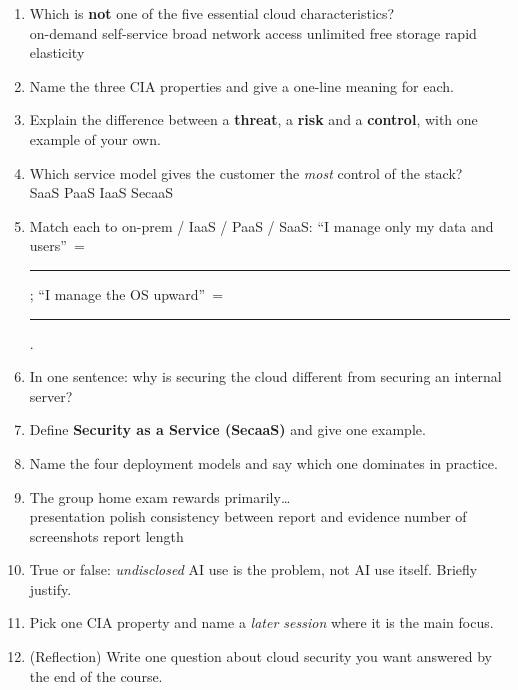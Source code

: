 \documentclass[11pt]{article}
\begin{document}
\begin{enumerate}
\item Which is \textbf{not} one of the five essential cloud characteristics?\\
      \cbox on-demand self-service \quad \cbox broad network access \quad
      \cbox unlimited free storage \quad \cbox rapid elasticity
\item Name the three CIA properties and give a one-line meaning for each.
\item Explain the difference between a \textbf{threat}, a \textbf{risk} and a \textbf{control}, with
      one example of your own.
\item Which service model gives the customer the \emph{most} control of the stack?\\
      \cbox SaaS \quad \cbox PaaS \quad \cbox IaaS \quad \cbox SecaaS
\item Match each to on-prem / IaaS / PaaS / SaaS: ``I manage only my data and users'' \,=\,
      \rule{2.2cm}{0.3pt}; \quad ``I manage the OS upward'' \,=\, \rule{2.2cm}{0.3pt}.
\item In one sentence: why is securing the cloud different from securing an internal server?
\item Define \textbf{Security as a Service (SecaaS)} and give one example.
\item Name the four deployment models and say which one dominates in practice.
\item The group home exam rewards primarily\dots\\
      \cbox presentation polish \quad \cbox consistency between report and evidence \quad
      \cbox number of screenshots \quad \cbox report length
\item True or false: \emph{undisclosed} AI use is the problem, not AI use itself. Briefly justify.
\item Pick one CIA property and name a \emph{later session} where it is the main focus.
\item (Reflection) Write one question about cloud security you want answered by the end of the course.
\end{enumerate}
\end{document}
